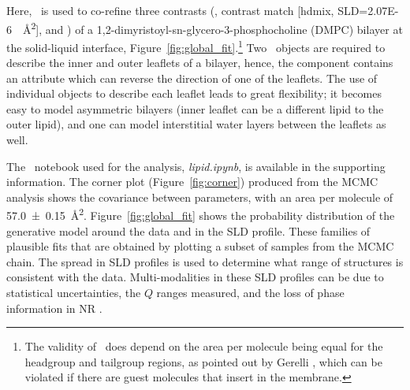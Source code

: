\documentclass[pdf,preprint]{iucr}
\begin{document}
Here, \LipidLeaflet\ is used to co-refine three contrasts (,  contrast match [hdmix, SLD=\SI{2.07E-6}{\per\square\angstrom}], and ) of a 1,2-dimyristoyl-sn-glycero-3-phospho\-choline (DMPC) bilayer at the solid-liquid interface, Figure~\ref{fig:global_fit}.\footnote{The validity of \LipidLeaflet\ does depend on the area per molecule being equal for the headgroup and tailgroup regions, as pointed out by Gerelli \cite{Gerelli2016}, which can be violated if there are guest molecules that insert in the membrane.} Two \LipidLeaflet\ objects are required to describe the inner and outer leaflets of a bilayer, hence, the component contains an attribute which can reverse the direction of one of the leaflets. The use of individual objects to describe each leaflet leads to great flexibility; it becomes easy to model asymmetric bilayers (inner leaflet can be a different lipid to the outer lipid), and one can model interstitial water layers between the leaflets as well.

The \Jupyter\ notebook used for the analysis, \emph{lipid.ipynb}, is available in the supporting information. The corner plot (Figure~\ref{fig:corner}) produced from the MCMC analysis shows the covariance between parameters, with an area per molecule of \SI{57.0 \pm0.15}{\square\angstrom}. Figure~\ref{fig:global_fit} shows the probability distribution of the generative model around the data and in the SLD profile. These families of plausible fits that are obtained by plotting a subset of samples from the MCMC chain. The spread in SLD profiles is used to determine what range of structures is consistent with the data. Multi-modalities in these SLD profiles can be due to statistical uncertainties, the $Q$ ranges measured, and the loss of phase information in NR \cite{Majkrzak1999, Heinrich2009}.
\end{document}
